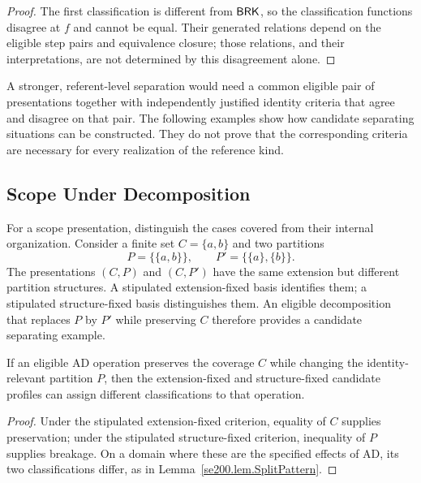 \begin{proof}
  The first classification is different from $\textsf{BRK}$, so the
  classification functions disagree at $f$ and cannot be equal.
  Their generated relations depend on the eligible step pairs and
  equivalence closure; those relations, and their interpretations,
  are not determined by this disagreement alone.
\end{proof}

A stronger, referent-level separation would need a common eligible
pair of presentations together with independently justified identity
criteria that agree and disagree on that pair.
The following examples
show how candidate separating situations can be constructed.
They do
not prove that the corresponding criteria are necessary for every
realization of the reference kind.

\subsection{Scope Under Decomposition}
\label{subsec:scope_split}

For a scope presentation, distinguish the cases covered from their
internal organization.
Consider a finite set $C=\{a,b\}$ and two
partitions
\[
  P=\{\{a,b\}\},\qquad P'=\{\{a\},\{b\}\}.
\]
The presentations $(C,P)$ and $(C,P')$ have the same extension but
different partition structures.
A stipulated extension-fixed basis
identifies them; a stipulated structure-fixed basis distinguishes them.
An eligible decomposition that replaces $P$ by $P'$ while preserving $C$
therefore provides a candidate separating example.

\begin{proposition}
  \label{se200.prop.ScopeUnderdetermination}
  If an eligible $\mathrm{AD}$ operation preserves the coverage $C$
  while changing the identity-relevant partition $P$, then the
  extension-fixed and structure-fixed candidate profiles can assign
  different classifications to that operation.
\end{proposition}

\begin{proof}
  Under the stipulated extension-fixed criterion, equality of $C$
  supplies preservation; under the stipulated structure-fixed
  criterion, inequality of $P$ supplies breakage.
  On a domain where these are the specified effects of $\mathrm{AD}$,
  its two classifications differ, as in
  Lemma~\ref{se200.lem.SplitPattern}.
\end{proof}

